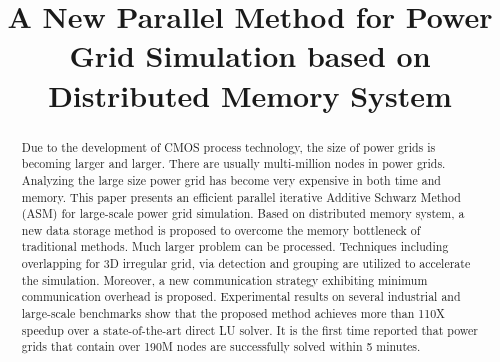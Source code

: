 \documentclass{sig-alternate}
\begin{document}
\title{A New Parallel Method for Power Grid Simulation based on Distributed Memory System}

\maketitle

\begin{comment}
This paper presents an efficient parallel Domain Decomposition method for large-scale power grid simulation. 
Based on multi-core platform, a new data storage strategy is proposed to overcome the memory bottleneck of traditional methods. 
Techniques as 3D irregular grid friendly overlapping, via detection as well as grouping techniques are utilized to accelerate the 
simulation. A new communication strategy is proposed and exhibits minimum communication overhead. Experimental results on several 
industrial and large-scale benchmarks show that the proposed method achieves more than 110X speedup over a state-of-the-art direct 
LU solver. Power grid containing over 190M nodes could be solved within 5 minutes.
\end{comment}

\begin{abstract}
Due to the development of CMOS process technology, the size of power grids is becoming larger and larger. There are usually 
multi-million nodes in power grids. Analyzing the large size power grid has become very expensive in both time and memory. This paper 
presents an efficient parallel iterative Additive Schwarz Method (ASM) for large-scale power grid simulation. Based on distributed 
memory system, a new 
data storage method is proposed to overcome the memory bottleneck of traditional methods. Much larger problem can be processed. 
Techniques including overlapping for 3D irregular grid, via detection and grouping are utilized to accelerate the 
simulation. Moreover, a new communication strategy exhibiting minimum communication overhead is proposed. Experimental results on 
several 
industrial and large-scale benchmarks show that the proposed method achieves more than 110X speedup over a state-of-the-art direct 
LU solver. It is the first time reported that power grids that contain over 190M nodes are successfully solved within 5 minutes.	
\end{abstract}
\end{document}

